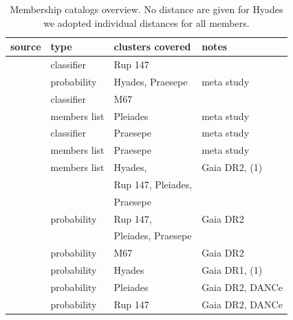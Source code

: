 \documentclass{aa}
\begin{document}
\begin{appendix}

\begin{table}
\caption{Membership catalogs overview. No distance are given for Hyades we adopted individual distances for all members. }
\label{tab:app:memberships}
\centering
\begin{tabular}{llll}     %
\hline\hline
     source  & type  & clusters covered & notes\\
\hline
   \citet{curtis_ruprecht_2013} & classifier & Rup 147 & \\
   \citet{douglas_praesepe_hyades_2014} & probability & Hyades, Praesepe & meta study \\
   \citet{gonzalez_m67mem_2016} & classifier & M67 & \\
   \citet{rebull_rotation_2016} & members list & Pleiades & meta study\\
   \citet{rebull_praesepe_2017} & classifier & Praesepe & meta study\\
   \citet{douglas_poking_2017} & members list & Praesepe & meta study\\
   \citet{gaia_dr2_2018_hrd} & members list & Hyades,   & Gaia DR2, (1)\\%
   &&Rup 147, Pleiades, &\\
   &&Praesepe&\\
   \citet{cantat_gaudin_2018} & probability & Rup 147, & Gaia DR2\\%
   && Pleiades, Praesepe&\\
   \citet{gao_m67mem_2018} & probability & M67 & Gaia DR2\\
   \citet{reino_hyades_2018} & probability & Hyades & Gaia DR1, (1)\\
   \citet{olivares_pleiades_2018} & probability & Pleiades & Gaia DR2, DANCe\\
   \citet{olivares_ngc6774_2019} & probability & Rup 147 & Gaia DR2, DANCe\\
\hline
\end{tabular}
\end{table}



\end{appendix}
\end{document}
